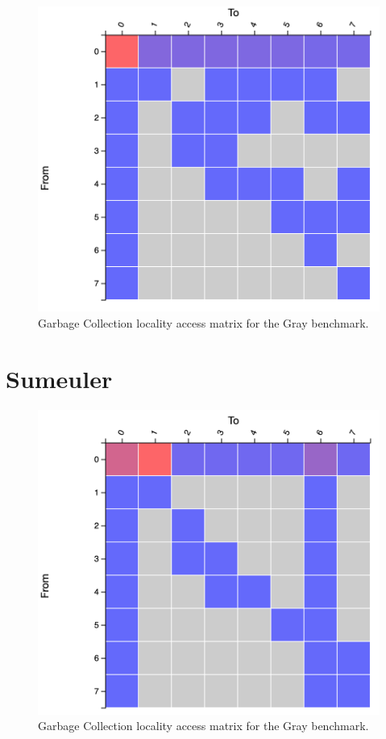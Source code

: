 \documentclass[a4paper,11pt]{article}
\begin{document}
\begin{figure}[!htb]
    \centering
    \includegraphics[width=0.6\linewidth]{TechMemo/gc/images/gray_gc.png}
    \caption{Garbage Collection locality access matrix for the Gray benchmark.}
    \label{fig:my_label}
\end{figure}

\section{Sumeuler}

\begin{table}[!htb]
  \centering
  \caption{Garbage Collection frequencies per region and per generation.}
  \label{table:baseline}
\end{table}

\begin{figure}[!htb]
    \centering
    \includegraphics[width=0.6\linewidth]{TechMemo/gc/images/sumeuler_gc.png}
    \caption{Garbage Collection locality access matrix for the Gray benchmark.}
    \label{fig:my_label}
\end{figure}
\end{document}
